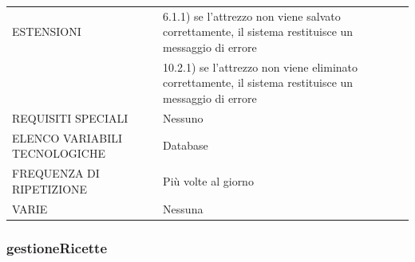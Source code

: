 \documentclass[a4paper, titlepage]{article}
\begin{document}
\begin{longtable}{p{6cm}p{7cm}}
    ESTENSIONI
    & 6.1.1) se l’attrezzo non viene salvato correttamente, il sistema restituisce un messaggio di errore\\
    & 10.2.1) se l’attrezzo non viene eliminato correttamente, il sistema restituisce un messaggio di errore\\\midrule
    REQUISITI SPECIALI & Nessuno\\\midrule
    ELENCO VARIABILI TECNOLOGICHE & Database\\\midrule
    FREQUENZA DI RIPETIZIONE & Più volte al giorno\\\midrule
    VARIE & Nessuna\\\bottomrule
\end{longtable}
\vphantom{}
\subsubsection{gestioneRicette}
\end{document}
